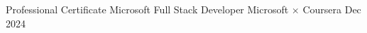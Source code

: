 
\begin{cventries}

  \cvshortentry
    {Professional Certificate}
    {Microsoft Full Stack Developer}
    {Microsoft $\times$ Coursera}
    {Dec 2024}

\end{cventries}
